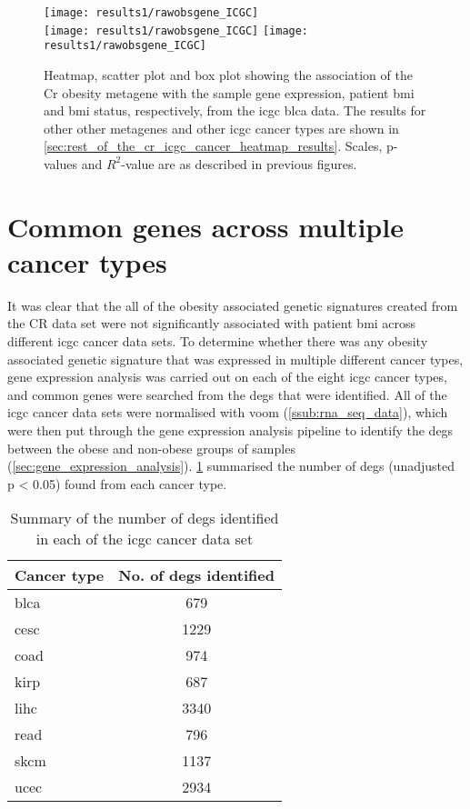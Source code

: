 \begin{figure}[htp!]
	\centering
	\texttt{[image: results1/rawobsgene\_ICGC]}\\
	\vspace{1em}
	\texttt{[image: results1/rawobsgene\_ICGC]}
	\hfill
	\texttt{[image: results1/rawobsgene\_ICGC]}
	\caption[Cr obesity metagene in the \acrshort{icgc} \acrshort{blca} data]{Heatmap, scatter plot and box plot showing the association of the Cr obesity metagene with the sample gene expression, patient \gls{bmi} and \gls{bmi} status, respectively, from the \acrshort{icgc} \acrshort{blca} data.
	The results for other other metagenes and other \gls{icgc} cancer types are shown in \cref{sec:rest_of_the_cr_icgc_cancer_heatmap_results}.
	Scales, p-values and $R^2$-value are as described in previous figures.}
	\label{fig:degmetaicgc}
\end{figure}

\section{Common genes across multiple cancer types}
\label{sec:common_genes_across_multiple_cancer_types}

It was clear that the all of the obesity associated genetic signatures created from the CR data set were not significantly associated with patient \gls{bmi} across different \gls{icgc} cancer data sets.
To determine whether there was any obesity associated genetic signature that was expressed in multiple different cancer types, gene expression analysis was carried out on each of the eight \gls{icgc} cancer types, and common genes were searched from the \glspl{deg} that were identified.
All of the \gls{icgc} cancer data sets were normalised with voom (\cref{ssub:rna_seq_data}), which were then put through the gene expression analysis pipeline to identify the \glspl{deg} between the obese and non-obese groups of samples (\cref{sec:gene_expression_analysis}).
\cref{tab:icgcdegnum} summarised the number of \glspl{deg}  (unadjusted p \textless{} 0.05) found from each cancer type.

\begin{table}[tb]
	\centering
	\caption{Summary of the number of \glspl{deg} identified in each of the \gls{icgc} cancer data set}
	\label{tab:icgcdegnum}
	\begin{tabular}{lc}
		Cancer type & No. of \glspl{deg} identified\\
		\hline
		\hline
		\rule{0pt}{2.25ex}\gls{blca} & 679 \\
		\gls{cesc} & 1229\\
		\gls{coad} & 974\\
		\gls{kirp} & 687\\
		\gls{lihc} & 3340\\
		\gls{read} & 796\\
		\gls{skcm} & 1137\\
		\gls{ucec} & 2934\\
		\hline
		\hline
	\end{tabular}
\end{table}

